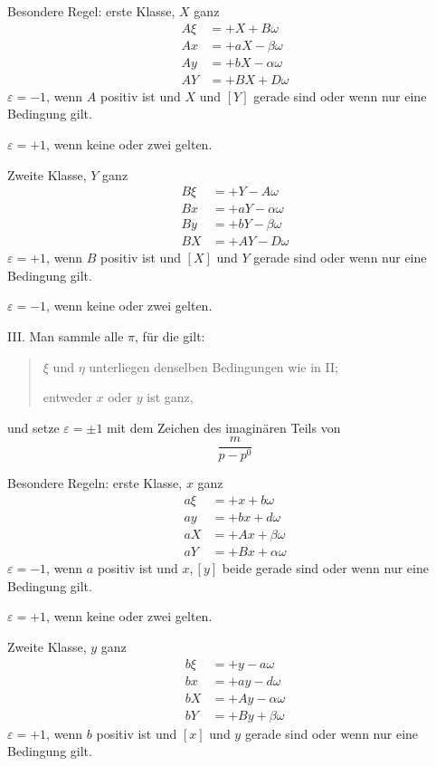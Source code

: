 Besondere Regel: erste Klasse, $X$ ganz
\[
\begin{aligned}
A\xi&=+X+B\omega\\
Ax&=+aX-\beta\omega\\
Ay&=+bX-\alpha\omega\\
AY&=+BX+D\omega
\end{aligned}
\]
$\varepsilon=-1$, wenn $A$ positiv ist und $X$ und $[Y]$ gerade sind oder wenn nur eine Bedingung gilt.

$\varepsilon=+1$, wenn keine oder zwei gelten.

Zweite Klasse, $Y$ ganz
\[
\begin{aligned}
B\xi&=+Y-A\omega\\
Bx&=+aY-\alpha\omega\\
By&=+bY-\beta\omega\\
BX&=+AY-D\omega
\end{aligned}
\]
$\varepsilon=+1$, wenn $B$ positiv ist und $[X]$ und $Y$ gerade sind oder wenn nur eine Bedingung gilt.

$\varepsilon=-1$, wenn keine oder zwei gelten.

\clearpage
{}
III. Man sammle alle $\pi$, für die gilt:
\begin{quote}
$\xi$ und $\eta$ unterliegen denselben Bedingungen wie in II;\par
entweder $x$ oder $y$ ist ganz,
\end{quote}
und setze $\varepsilon=\pm1$ mit dem Zeichen des imaginären Teils von
\[
\frac{m}{p-p^0}
\]

Besondere Regeln: erste Klasse, $x$ ganz
\[
\begin{aligned}
a\xi&=+x+b\omega\\
ay&=+bx+d\omega\\
aX&=+Ax+\beta\omega\\
aY&=+Bx+\alpha\omega
\end{aligned}
\]
$\varepsilon=-1$, wenn $a$ positiv ist und $x,[y]$ beide gerade sind oder wenn nur eine Bedingung gilt.

$\varepsilon=+1$, wenn keine oder zwei gelten.

Zweite Klasse, $y$ ganz
\[
\begin{aligned}
b\xi&=+y-a\omega\\
bx&=+ay-d\omega\\
bX&=+Ay-\alpha\omega\\
bY&=+By+\beta\omega
\end{aligned}
\]
$\varepsilon=+1$, wenn $b$ positiv ist und $[x]$ und $y$ gerade sind oder wenn nur eine Bedingung gilt.

